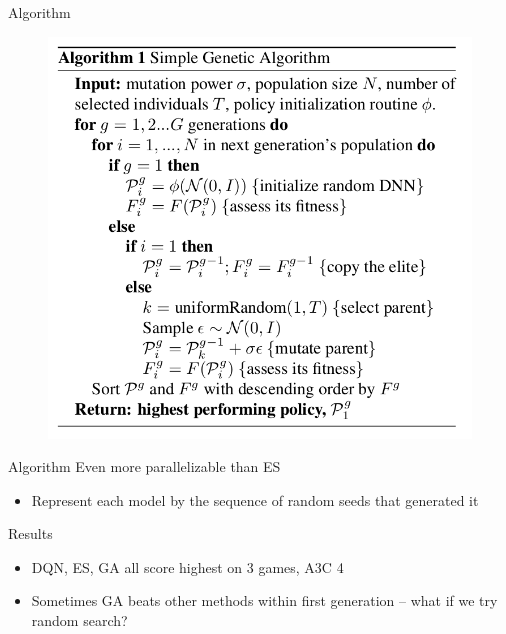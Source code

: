 \documentclass{beamer}
\begin{document}
	\begin{frame}{Algorithm}
		\begin{figure}
			\centering
			\includegraphics[height=0.7\textheight]{deep_ga_algorithm.png}
			\label{fig4}
		\end{figure}
	\end{frame}
	
	\begin{frame}{Algorithm}
		Even more parallelizable than ES
		\begin{itemize}
			\item Represent each model by the sequence of random seeds that generated it
		\end{itemize}
	\end{frame}
	
	\begin{frame}{Results}
		\begin{itemize}
			\item DQN, ES, GA all score highest on 3 games, A3C 4
			\item Sometimes GA beats other methods within first generation -- what if we try random search?
		\end{itemize}
	\end{frame}
	
\end{document}
